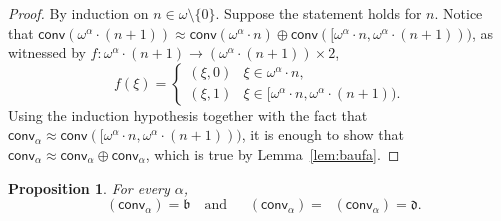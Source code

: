 \documentclass{amsart}
\theoremstyle{plain}
\newtheorem{proposition}[theorem]{Proposition}
\theoremstyle{definition}
\theoremstyle{remark}
\newcommand{\bnumber}{\mathfrak{b}}
\newcommand{\dnumber}{\mathfrak{d}}
\DeclareMathOperator{\add}{add}
\DeclareMathOperator{\non}{non}
\DeclareMathOperator{\cof}{cof}
\DeclareMathOperator{\addo}{\add^*_{\omega}}
\DeclareMathOperator{\nono}{\non^*_{\omega}}
\DeclareMathOperator{\cofo}{\cof^*_{\omega}}
\newcommand{\conv}{\mathsf{conv}}
\begin{document}
\begin{proof}
By induction on $n\in\omega\setminus\{0\}$. Suppose the statement holds for $n$. Notice that $\conv(\omega^\alpha\cdot (n+1))\approx\conv(\omega^\alpha\cdot n)\oplus\conv([\omega^\alpha\cdot n, \omega^\alpha\cdot (n+1)))$, as witnessed by $f:\omega^\alpha\cdot (n+1)\to (\omega^\alpha\cdot (n+1) )\times 2$, 
\begin{equation*}
f(\xi) =
\begin{cases}
(\xi,0) & \xi \in \omega^\alpha\cdot n,\\
(\xi,1) & \xi \in [\omega^\alpha\cdot n, \omega^\alpha\cdot (n+1)).
    \end{cases}
\end{equation*}
Using the induction hypothesis together with the fact that $\conv_\alpha\approx \conv([\omega^\alpha\cdot n, \omega^\alpha\cdot (n+1)))$, it is enough to show that $\conv_\alpha\approx \conv_\alpha\oplus\conv_\alpha$, which is true by Lemma~\ref{lem:baufa}.
\end{proof}



\begin{proposition} 
For every $\alpha$, 
$$\addo(\conv_\alpha)= \bnumber
 \quad \text{and} \quad \cofo(\conv_\alpha)=\nono(\conv_\alpha) = \dnumber.$$
\end{proposition}
\end{document}
